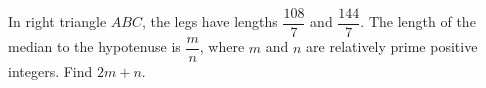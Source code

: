 In right triangle $ABC$, the legs have lengths $\dfrac{108}{7}$ and $\dfrac{144}{7}$. The length of the median to the hypotenuse is $\dfrac mn$, where $m$ and $n$ are relatively prime positive integers. Find $2m+n$.
